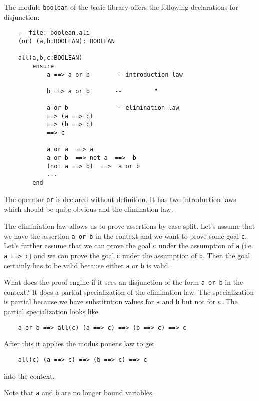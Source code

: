 The module \lstinline!boolean! of the basic library offers the following declarations
for disjunction:

\begin{lstlisting}
    -- file: boolean.ali
    (or) (a,b:BOOLEAN): BOOLEAN

    all(a,b,c:BOOLEAN)
        ensure
            a ==> a or b       -- introduction law

            b ==> a or b       --         "

            a or b             -- elimination law
            ==> (a ==> c)
            ==> (b ==> c)
            ==> c

            a or a  ==> a
            a or b  ==> not a  ==>  b
            (not a ==> b)  ==>  a or b
            ...
        end
\end{lstlisting}

The operator \lstinline!or! is declared without definition. It has two
introduction laws which should be quite obvious and the elimination law.

The eliminiation law allows us to prove assertions by case split. Let's assume
that we have the assertion \lstinline!a or b! in the context and we want to
prove some goal \lstinline!c!. Let's further assume that we can prove the goal
\lstinline!c! under the assumption of \lstinline!a! (i.e. \lstinline!a ==> c!)
and we can prove the goal \lstinline!c! under the assumption of
\lstinline!b!. Then the goal certainly has to be valid because either
\lstinline!a!  or \lstinline!b! is valid.

What does the proof engine if it sees an disjunction of the form
\lstinline!a or b! in the context? It does a partial specialization of the
elimination law. The specialization is partial because we have substitution
values for \lstinline!a! and \lstinline!b!  but not for \lstinline!c!. The
partial specialization looks like

\begin{lstlisting}
    a or b ==> all(c) (a ==> c) ==> (b ==> c) ==> c
\end{lstlisting}

After this it applies the modus ponens law to get
\begin{lstlisting}
    all(c) (a ==> c) ==> (b ==> c) ==> c
\end{lstlisting}
into the context.


Note that \lstinline!a! and \lstinline!b! are no longer bound variables.





